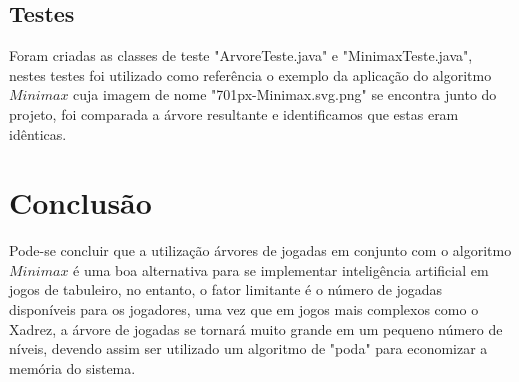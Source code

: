 \documentclass[a4paper,11pt]{article}
\begin{document}
\subsection{Testes}
Foram criadas as classes de teste "ArvoreTeste.java" e "MinimaxTeste.java", nestes testes foi utilizado como referência o exemplo da aplicação do algoritmo $Minimax$ cuja imagem de nome "701px-Minimax.svg.png" se encontra junto do projeto, foi comparada a árvore resultante e identificamos que estas eram idênticas.

\section{Conclusão}
Pode-se concluir que a utilização árvores de jogadas em conjunto com o algoritmo $Minimax$ é uma boa alternativa para se implementar inteligência artificial em jogos de tabuleiro, no entanto, o fator limitante é o número de jogadas disponíveis para os jogadores, uma vez que em jogos mais complexos como o Xadrez, a árvore de jogadas se tornará muito grande em um pequeno número de níveis, devendo assim ser utilizado um algoritmo de "poda" para economizar a memória do sistema.

\nocite{*}					%
		
		
\end{document}

